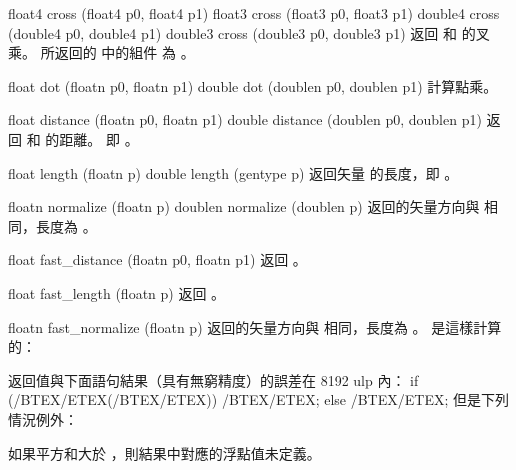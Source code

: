 float4 cross (float4 p0, float4 p1)
float3 cross (float3 p0, float3 p1)
double4 cross (double4 p0, double4 p1)
double3 cross (double3 p0, double3 p1)
\stopbuffer
{}
返回  和  的叉乘。
所返回的  中的組件  為 。
\stopbuffer

float dot (floatn p0, floatn p1)
double dot (doublen p0, doublen p1)
\stopbuffer
{}
計算點乘。
\stopbuffer

float distance (floatn p0,
		floatn p1)
double distance (doublen p0,
		doublen p1)
\stopbuffer
{}
返回  和  的距離。
即 。
\stopbuffer

float length (floatn p)
double length (gentype p)
\stopbuffer
{}
返回矢量  的長度，即 。
\stopbuffer

floatn normalize (floatn p)
doublen normalize (doublen p)
\stopbuffer
{}
返回的矢量方向與  相同，長度為 。
\stopbuffer

float fast_distance (floatn p0,
		floatn p1)
\stopbuffer
{}
返回 。
\stopbuffer

float fast_length (floatn p)
\stopbuffer
{}
返回 。
\stopbuffer

floatn fast_normalize (floatn p)
\stopbuffer
{}
返回的矢量方向與  相同，長度為 。
 是這樣計算的：


返回值與下面語句結果（具有無窮精度）的誤差在 8192 ulp 內：
\starttyping[option=none,escape=yes,indentnext=no]
if (/BTEX/ETEX(/BTEX/ETEX))
	/BTEX/ETEX;
else
	/BTEX/ETEX;
\stoptyping
但是下列情況例外：
\startigNum
\item 如果平方和大於 ，則結果中對應的浮點值未定義。

